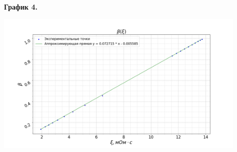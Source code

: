 \documentclass[15pt,a5paper,reqno]{article}
\begin{document}
    \noindent\hypertarget{graph_4}{\textbf{График 4.}}
    \begin{center}
        \includegraphics[width = 0.9\textwidth]{images/graph_4.png}
    \end{center}
\end{document}
